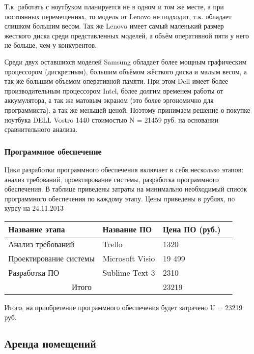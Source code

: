 Т.к. работать с ноутбуком планируется не в одном и том же месте, а при постоянных перемещениях, то модель от Lenovo не подходит, т.к. обладает слишком большим весом. Так же Lenovo имеет самый маленький размер жесткого диска среди представленных моделей, а объём оперативной пяти у него не больше, чем у конкурентов.

Среди двух оставшихся моделей Samsung обладает более мощным гра\-фическим процессором (дискретным), большим объёмом жёсткого диска и малым весом, а так же большим объемом оперативной памяти. При этом Dell имеет более производительным процессором Intel, более долгим временем работы от аккумулятора, а так же матовым экраном (это более эргономично для программиста), а так же меньшей ценой. Поэтому принимаем решение о покупке ноутбука DELL Vostro 1440 стоимостью N = 21459 руб. на основании сравнительного анализа.

\subsubsection{Программное обеспечение}

Цикл разработки программного обеспечения включает в себя несколько этапов: анализ требований, проектирование системы, разработка програм\-много обеспечения. В таблице приведены затраты на минимально необходимый список программного обеспечения по каждому этапу. Цены приведены в рублях, по курсу на 24.11.2013

\begin{table}[H]
\begin{center}
\begin{tabular}{|p{3.5cm}|p{3.6cm}|p{3.6cm}|p{3.4cm}|}
\hline
Название этапа&
Название ПО&
Цена ПО (руб.)\\
\hline
Анализ требований&
Trello&
1320\\
\hline
Проектирование системы&
Microsoft Visio&
19 499\\
\hline
Разработка ПО&
Sublime Text 3&
2310\\
\hline
\multicolumn{2}{|c|}{Итого} &23219\\
\hline
\end{tabular}
\end{center}
\end{table}

Итого, на приобретение программного обеспечения будет затрачено U = 23219 руб.

\subsection{Аренда помещений}


